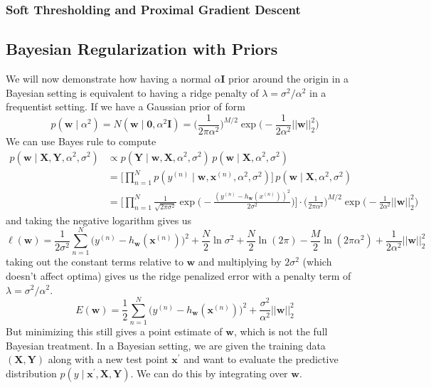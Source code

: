     \subsubsection{Soft Thresholding and Proximal Gradient Descent} 

  \subsection{Bayesian Regularization with Priors}

    We will now demonstrate how having a normal $\alpha \mathbf{I}$ prior around the origin in a Bayesian setting is equivalent to having a ridge penalty of $\lambda = \sigma^2 / \alpha^2$ in a frequentist setting. If we have a Gaussian prior of form 
    \[p(\mathbf{w} \mid \alpha^2) = N(\mathbf{w} \mid \mathbf{0}, \alpha^2 \mathbf{I}) = \bigg( \frac{1}{2 \pi \alpha^2} \bigg)^{M/2} \exp \bigg( -\frac{1}{2\alpha^2} ||\mathbf{w}||^2_2 \bigg)\]
    We can use Bayes rule to compute 
    \begin{align*}
        p(\mathbf{w} \mid \mathbf{X}, \mathbf{Y}, \alpha^2, \sigma^2) & \propto p(\mathbf{Y} \mid \mathbf{w}, \mathbf{X}, \alpha^2, \sigma^2) \, p(\mathbf{w} \mid \mathbf{X}, \alpha^2, \sigma^2) \\
        & = \bigg[ \prod_{n=1}^N p(y^{(n)} \mid \mathbf{w}, \mathbf{x}^{(n)}, \alpha^2, \sigma^2 )\bigg] \, p(\mathbf{w} \mid \mathbf{X}, \alpha^2, \sigma^2) \\
        & = \bigg[ \prod_{n=1}^N \frac{1}{\sqrt{2 \pi \sigma^2}} \exp \bigg( - \frac{(y^{(n)} - h_\mathbf{w} (x^{(n)}))^2}{2 \sigma^2} \bigg) \bigg] \cdot \bigg( \frac{1}{2 \pi \alpha^2} \bigg)^{M/2} \exp \bigg( -\frac{1}{2\alpha^2} ||\mathbf{w}||^2_2 \bigg)
    \end{align*}
    and taking the negative logarithm gives us 
    \[\ell(\mathbf{w}) = \frac{1}{2\sigma^2} \sum_{n=1}^N \big(y^{(n)} - h_\mathbf{w} (\mathbf{x}^{(n)}) \big)^2 + \frac{N}{2}\ln{\sigma^2} + \frac{N}{2} \ln(2\pi) - \frac{M}{2} \ln(2\pi \alpha^2) + \frac{1}{2 \alpha^2} ||\mathbf{w}||_2^2\]
    taking out the constant terms relative to $\mathbf{w}$ and multiplying by $2 \sigma^2$ (which doesn't affect optima) gives us the ridge penalized error with a penalty term of $\lambda = \sigma^2 / \alpha^2$. 
    \[E(\mathbf{w}) = \frac{1}{2} \sum_{n=1}^N \big(y^{(n)} - h_\mathbf{w} (\mathbf{x}^{(n)}) \big)^2 + \frac{\sigma^2}{\alpha^2} ||\mathbf{w}||_2^2\]
    But minimizing this still gives a point estimate of $\mathbf{w}$, which is not the full Bayesian treatment. In a Bayesian setting, we are given the training data $(\mathbf{X}, \mathbf{Y})$ along with a new test point $\mathbf{x}^\prime$ and want to evaluate the predictive distribution $p(y \mid \mathbf{x}^\prime, \mathbf{X}, \mathbf{Y})$. We can do this by integrating over $\mathbf{w}$. 
